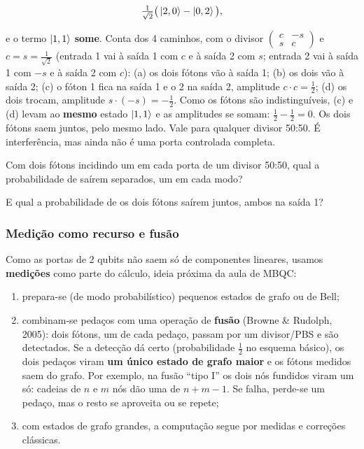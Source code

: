 \[
\tfrac{1}{\sqrt2}\big(\left|{2,0}\right>-\left|{0,2}\right>\big),
\]

e o termo \(\left|{1,1}\right>\) \textbf{some}. Conta dos 4 caminhos, com o divisor \(\begin{pmatrix}c&-s\\s&c\end{pmatrix}\) e \(c=s=\tfrac{1}{\sqrt2}\) (entrada 1 vai à saída 1 com \(c\) e à saída 2 com \(s\); entrada 2 vai à saída 1 com \(-s\) e à saída 2 com \(c\)): (a) os dois fótons vão à saída 1; (b) os dois vão à saída 2; (c) o fóton 1 fica na saída 1 e o 2 na saída 2, amplitude \(c\cdot c=\tfrac12\); (d) os dois trocam, amplitude \(s\cdot(-s)=-\tfrac12\). Como os fótons são indistinguíveis, (c) e (d) levam ao \textbf{mesmo} estado \(\left|{1,1}\right>\) e as amplitudes se somam: \(\tfrac12-\tfrac12=0\). Os dois fótons saem juntos, pelo mesmo lado. Vale para qualquer divisor 50:50. É interferência, mas ainda não é uma porta controlada completa.

Com dois fótons incidindo um em cada porta de um divisor 50:50, qual a probabilidade de saírem separados, um em cada modo?

E qual a probabilidade de os dois fótons saírem juntos, ambos na saída 1?

\subsubsection{Medição como recurso e fusão}\label{mediuxe7uxe3o-como-recurso-e-fusuxe3o}

Como as portas de 2 qubits não saem só de componentes lineares, usamos \textbf{medições} como parte do cálculo, ideia próxima da aula de MBQC:

\begin{enumerate}
\def\labelenumi{\arabic{enumi}.}
\tightlist
\item
  prepara-se (de modo probabilístico) pequenos estados de grafo ou de Bell;
\item
  combinam-se pedaços com uma operação de \textbf{fusão} (Browne \& Rudolph, 2005): dois fótons, um de cada pedaço, passam por um divisor/PBS e são detectados. Se a detecção dá certo (probabilidade \(\tfrac12\) no esquema básico), os dois pedaços viram \textbf{um único estado de grafo maior} e os fótons medidos saem do grafo. Por exemplo, na fusão ``tipo I'' os dois nós fundidos viram um só: cadeias de \(n\) e \(m\) nós dão uma de \(n+m-1\). Se falha, perde-se um pedaço, mas o resto se aproveita ou se repete;
\item
  com estados de grafo grandes, a computação segue por medidas e correções clássicas.
\end{enumerate}

